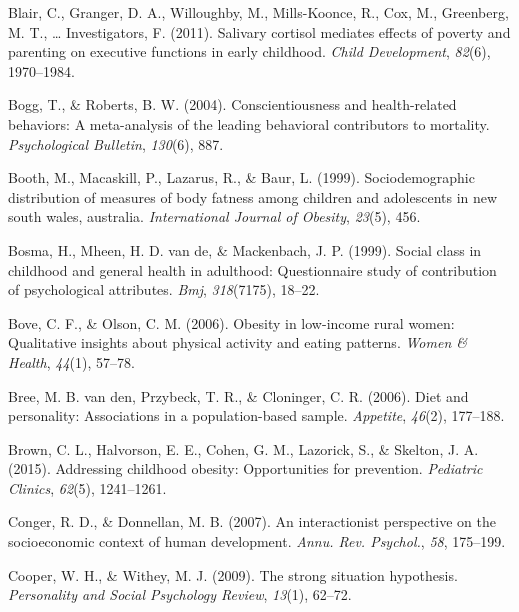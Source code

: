 \documentclass[man]{apa6}
\begin{document}
\leavevmode\hypertarget{ref-blair2011salivary}{}%
Blair, C., Granger, D. A., Willoughby, M., Mills-Koonce, R., Cox, M., Greenberg, M. T., \ldots{} Investigators, F. (2011). Salivary cortisol mediates effects of poverty and parenting on executive functions in early childhood. \emph{Child Development}, \emph{82}(6), 1970--1984.

\leavevmode\hypertarget{ref-bogg2004conscientiousness}{}%
Bogg, T., \& Roberts, B. W. (2004). Conscientiousness and health-related behaviors: A meta-analysis of the leading behavioral contributors to mortality. \emph{Psychological Bulletin}, \emph{130}(6), 887.

\leavevmode\hypertarget{ref-booth1999sociodemographic}{}%
Booth, M., Macaskill, P., Lazarus, R., \& Baur, L. (1999). Sociodemographic distribution of measures of body fatness among children and adolescents in new south wales, australia. \emph{International Journal of Obesity}, \emph{23}(5), 456.

\leavevmode\hypertarget{ref-bosma1999social}{}%
Bosma, H., Mheen, H. D. van de, \& Mackenbach, J. P. (1999). Social class in childhood and general health in adulthood: Questionnaire study of contribution of psychological attributes. \emph{Bmj}, \emph{318}(7175), 18--22.

\leavevmode\hypertarget{ref-bove2006obesity}{}%
Bove, C. F., \& Olson, C. M. (2006). Obesity in low-income rural women: Qualitative insights about physical activity and eating patterns. \emph{Women \& Health}, \emph{44}(1), 57--78.

\leavevmode\hypertarget{ref-van2006diet}{}%
Bree, M. B. van den, Przybeck, T. R., \& Cloninger, C. R. (2006). Diet and personality: Associations in a population-based sample. \emph{Appetite}, \emph{46}(2), 177--188.

\leavevmode\hypertarget{ref-brown2015addressing}{}%
Brown, C. L., Halvorson, E. E., Cohen, G. M., Lazorick, S., \& Skelton, J. A. (2015). Addressing childhood obesity: Opportunities for prevention. \emph{Pediatric Clinics}, \emph{62}(5), 1241--1261.

\leavevmode\hypertarget{ref-conger2007interactionist}{}%
Conger, R. D., \& Donnellan, M. B. (2007). An interactionist perspective on the socioeconomic context of human development. \emph{Annu. Rev. Psychol.}, \emph{58}, 175--199.

\leavevmode\hypertarget{ref-cooper2009strong}{}%
Cooper, W. H., \& Withey, M. J. (2009). The strong situation hypothesis. \emph{Personality and Social Psychology Review}, \emph{13}(1), 62--72.
\end{document}
